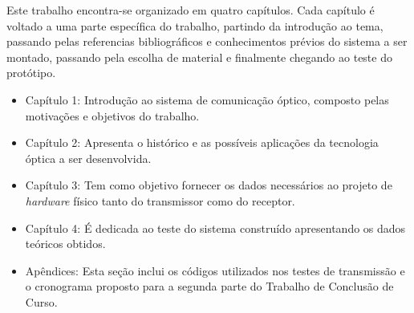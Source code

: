 Este trabalho encontra-se organizado em quatro capítulos. Cada capítulo é voltado a uma parte específica do trabalho, partindo da introdução ao tema, passando pelas referencias bibliográficos e  conhecimentos prévios do sistema a ser montado, passando pela escolha de material e finalmente chegando ao teste do protótipo. 
\begin{itemize}

	\item Capítulo 1: Introdução ao sistema de comunicação óptico, composto pelas motivações e objetivos do trabalho.
	
	\item Capítulo 2: Apresenta o histórico e as possíveis aplicações da tecnologia óptica a ser desenvolvida.
	
	\item Capítulo 3: Tem como objetivo fornecer os dados necessários ao projeto de \textit{hardware} físico tanto do transmissor como do receptor.
	
	\item Capítulo 4: É dedicada ao teste do sistema construído apresentando os dados teóricos obtidos.
	
	\item Apêndices: Esta seção inclui os códigos utilizados nos testes de transmissão e o cronograma proposto para a segunda parte do Trabalho de Conclusão de Curso.

\end{itemize}
